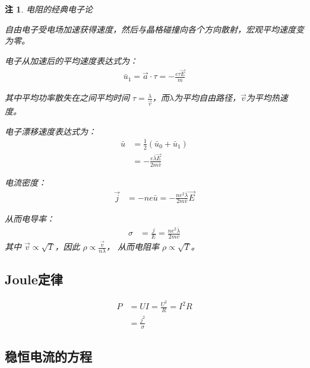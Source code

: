 \documentclass[12pt,onecolumn,a4paper]{book}
\newtheorem*{note}{注}
\numberwithin{table}{subsection}
\numberwithin{equation}{subsection}
\begin{document}
\begin{note}
    电阻的经典电子论

    自由电子受电场加速获得速度，然后与晶格碰撞向各个方向散射，宏观平均速度变为零。

    电子从加速后的平均速度表达式为：
    \begin{align}
        \bar{u}_1 = \vec{a} \cdot \tau = -\frac{e\tau \vec{E}}{m}
    \end{align}

    其中平均功率散失在之间平均时间 \(\tau = \frac{\lambda}{\vec{v}}\)，而\(\lambda\)为平均自由路径，\(\vec{v}\)为平均热速度。

    电子漂移速度表达式为：
    \begin{align}
        \bar{u} & = \frac{1}{2}(\bar{u}_0 + \bar{u}_1)        \\
                & = -\frac{e\bar{\lambda} \vec{E}}{2m\bar{v}}
    \end{align}

    电流密度：
    \begin{align}
        \vec{j} & = -ne\bar{u} = -\frac{ne^2\bar{\lambda}}{2m\bar{v}}\vec{E}
    \end{align}

    从而电导率：
    \begin{align}
        \sigma & = \frac{j}{E} = \frac{ne^2\bar{\lambda}}{2m\bar{v}}
    \end{align}
    其中 \(\vec{v} \propto \sqrt{T}\)，因此 \(\rho \propto \frac{\vec{v}}{n\lambda}\)， 从而电阻率 \(\rho \propto \sqrt{T}\)。

\end{note}

\subsection{Joule定律}

\begin{align}
    P & = U I = \frac{U^2}{R} = I^2 R \\
      & = \frac{j^2}{\sigma}
\end{align}

\subsection{稳恒电流的方程}
\end{document}
